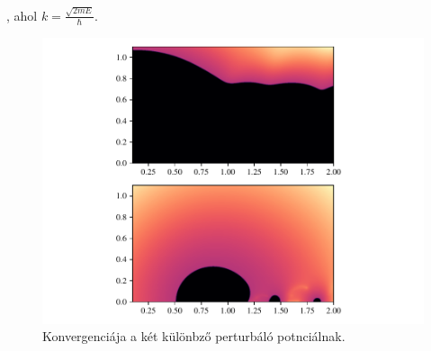 , ahol $k = \frac{\sqrt{2mE}}{\hbar}$.
\begin{figure}[H]
	\centering
	\includegraphics[scale=1]{./figs/convergence2.pdf}
	\caption[Rövid cím]{Konvergenciája a két különbző perturbáló potnciálnak.}
\end{figure}






